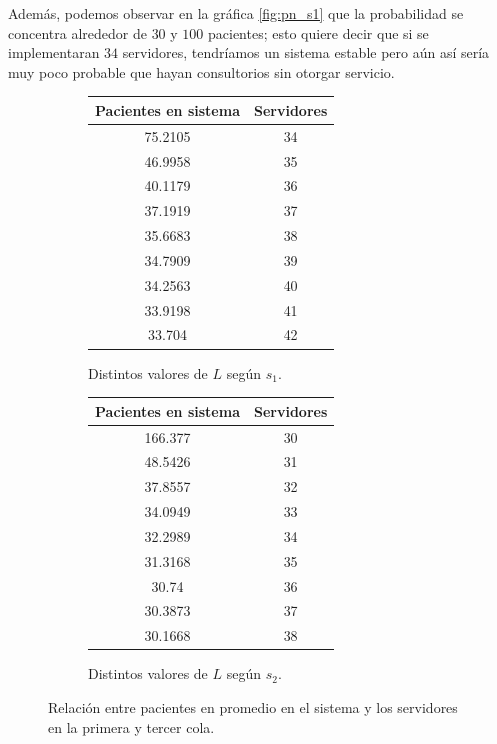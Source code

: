\documentclass[10pt]{article}
\begin{document}
    Además, podemos observar en la gráfica \ref{fig:pn_s1} que la probabilidad se concentra alrededor de $30$ y $100$ pacientes; esto quiere decir que si se implementaran $34$ servidores, tendríamos un sistema estable pero aún así sería muy poco probable que hayan consultorios sin otorgar servicio.
    
    \begin{figure}[!ht]
    	\centering
    	
    	\begin{subfigure}[c]{0.48\linewidth}
    		\centering
    		\begin{tabular}{|c|c|}
    			\hline
    			Pacientes en sistema & Servidores \\
    			\hline
    			75.2105 & 34 \\
    			46.9958 & 35 \\
    			40.1179 & 36 \\
    			37.1919 & 37 \\
    			35.6683 & 38 \\
    			34.7909 & 39 \\
    			34.2563 & 40 \\
    			33.9198 & 41 \\
    			33.704  & 42 \\
    			\hline
    		\end{tabular}
    		\caption{Distintos valores de $L$ según $s_{1}$.}
    		\label{tab:l_s1_comp}
    	\end{subfigure}
    	\begin{subfigure}[c]{0.48\linewidth}
    		\centering
    		\begin{tabular}{|c|c|}
    			\hline
    			Pacientes en sistema & Servidores \\
    			\hline
    			166.377 & 30 \\
    			48.5426 & 31 \\
    			37.8557 & 32 \\
    			34.0949 & 33 \\
    			32.2989 & 34 \\
    			31.3168 & 35 \\
    			30.74   & 36 \\
    			30.3873 & 37 \\
    			30.1668 & 38 \\
    			\hline
    		\end{tabular}
    		\caption{Distintos valores de $L$ según $s_{2}$.}
    		\label{tab:l_s2_comp}
    	\end{subfigure}
    	\caption{Relación entre pacientes en promedio en el sistema y los servidores en la primera y tercer cola.}
    	\label{fig:l_tables}
    \end{figure}
    
\end{document}

